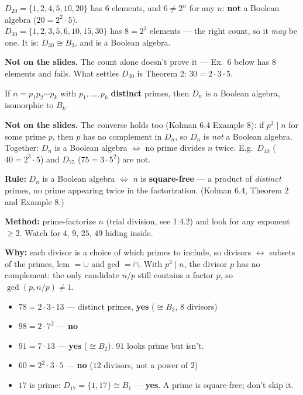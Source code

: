 \documentclass{fkt-notes}
\newcommand{\notslides}[1]{\par\noindent\textbf{Not on the slides.} #1\par}
\theoremstyle{definition}
\begin{document}
\begin{example}[6.4 Ex.~3: $D_{20}$ and $D_{30}$]
  $D_{20}=\{1,2,4,5,10,20\}$ has $6$ elements, and $6\ne2^n$ for any $n$:
  \textbf{not} a Boolean algebra ($20=2^2\cdot5$).\\
  $D_{30}=\{1,2,3,5,6,10,15,30\}$ has $8=2^3$ elements --- the right
  count, so it \emph{may} be one. It is: $D_{30}\cong B_3$, and is a
  Boolean algebra.
  \notslides{The count alone doesn't prove it --- Ex.~6 below has $8$
    elements and fails. What settles $D_{30}$ is Theorem 2:
    $30=2\cdot3\cdot5$.}
\end{example}

\begin{rulebox}[title={6.4 Theorem 2}]
  If $n=p_1p_2\cdots p_k$ with $p_1,\dots,p_k$ \textbf{distinct} primes,
  then $D_n$ is a Boolean algebra, isomorphic to $B_k$.
\end{rulebox}
\notslides{The converse holds too (Kolman 6.4 Example 8): if $p^2\mid n$
  for some prime $p$, then $p$ has no complement in $D_n$, so $D_n$ is
  \emph{not} a Boolean algebra. Together: $D_n$ is a Boolean algebra
  $\iff$ no prime divides $n$ twice. E.g.\ $D_{40}$ ($40=2^3\cdot5$) and
  $D_{75}$ ($75=3\cdot5^2$) are not.}

%
\begin{rulepar}
  \textbf{Rule:} $D_n$ is a Boolean algebra $\iff$ $n$ is
  \textbf{square-free} --- a product of \emph{distinct} primes, no prime
  appearing twice in the factorization. (Kolman 6.4, Theorem 2 and Example 8.)
\end{rulepar}

\textbf{Method:} prime-factorize $n$ (trial division, see 1.4.2) and look for any exponent $\ge 2$. Watch for $4$, $9$, $25$,
$49$ hiding inside.

\textbf{Why:} each divisor is a choice of which primes to include, so
divisors $\leftrightarrow$ subsets of the primes, lcm $= \cup$ and
gcd $= \cap$. With $p^2 \mid n$, the divisor $p$ has no complement:
the only candidate $n/p$ still contains a factor $p$, so
$\gcd(p, n/p) \ne 1$.

\begin{example}
  \leavevmode
  \begin{itemize}[nosep]
    \item $78 = 2 \cdot 3 \cdot 13$ --- distinct primes, \textbf{yes} ($\cong B_3$, $8$ divisors)
    \item $98 = 2 \cdot 7^2$ --- \textbf{no}
    \item $91 = 7 \cdot 13$ --- \textbf{yes} ($\cong B_2$). $91$ looks prime but isn't.
    \item $60 = 2^2 \cdot 3 \cdot 5$ --- \textbf{no} ($12$ divisors, not a power of $2$)
    \item $17$ is prime: $D_{17} = \{1, 17\} \cong B_1$ --- \textbf{yes}.
          A prime is square-free; don't skip it.
  \end{itemize}
\end{example}
\end{document}
